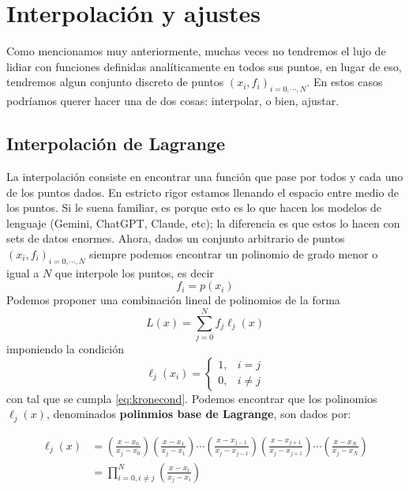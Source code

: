 \section{Interpolación y ajustes}

Como mencionamos muy anteriormente, muchas veces no tendremos el lujo de lidiar con funciones definidas analíticamente en todos sus puntos, en lugar de eso, tendremos algun conjunto discreto de puntos $(x_{i}, f_{i})_{i = 0, \cdots, N}$. En estos casos podríamos querer hacer una de dos cosas: interpolar, o bien, ajustar.

\subsection{Interpolación de Lagrange}
La interpolación consiste en encontrar una función que pase por todos y cada uno de los puntos dados. En estricto rigor estamos llenando el espacio entre medio de los puntos. Si le suena familiar, es porque esto es lo que hacen los modelos de lenguaje (Gemini, ChatGPT, Claude, etc); la diferencia es que estos lo hacen con sets de datos enormes. Ahora, dados un conjunto arbitrario de puntos $(x_{i}, f_{i})_{i=0,\cdots ,N}$ siempre podemos encontrar un polinomio de grado menor o igual a $N$ que interpole los puntos, es decir
\begin{equation} \label{eq:kronecond}
  f_{i} = p(x_{i})
\end{equation}
Podemos proponer una combinación lineal de polinomios de la forma
\begin{equation} \label{eq:interpol}
  L(x) = \sum_{j = 0}^{N}f_{j}\ell_{j}(x)
 \end{equation}
 imponiendo la condición
 \begin{equation} \label{eq:kronecker}
   \ell_{j}(x_{i}) =
   \begin{cases}
     1, & i = j \\
     0, & i \neq j
   \end{cases}
  \end{equation}
con tal que se cumpla \eqref{eq:kronecond}. Podemos encontrar que los polinomios $\ell_{j}(x)$, denominados \textbf{polinmios base de Lagrange}, son dados por:

\begin{align}
  \ell_{j}(x) &= \left( \frac{x-x_{0}}{x_{j} - x_{0}} \right) \left( \frac{x-x_{1}}{x_{j} - x_{1}} \right) \cdots \left( \frac{x-x_{j-1}}{x_{j} - x_{j-1}} \right) \left( \frac{x-x_{j+1}}{x_{j} - x_{j+1}} \right) \cdots \left( \frac{x-x_{N}}{x_{j} - x_{N}} \right) \\
              &= \prod_{i = 0, i \neq j}^{N}\left( \frac{x - x_{i}}{x_{j} - x_{i}} \right)
 \end{align}


